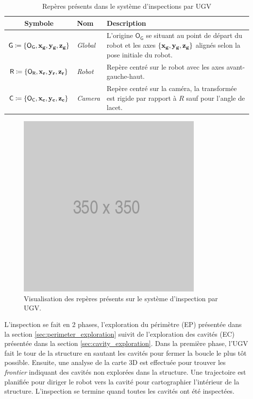 \begin{table}[htp]
  \centering
  \setlength{\tabcolsep}{12pt}
  \begin{tabular}[htp]{|c|l|p{9cm}|}
    \hline
    Symbole & Nom                   & Description\\\hline
    $\mathsf{G} \coloneqq \{\mathsf{O_G}, \mathbf{x_g}, \mathbf{y_g}, \mathbf{z_g} \} $     &  \textit{Global}      & L'origine $\mathsf{O_G}$ se situant au point de départ du robot et les axes $\{\mathbf{x_g}, \mathbf{y_g}, \mathbf{z_g} \}$ alignés selon la pose initiale du robot.\\\hline
    $\mathsf{R} \coloneqq \{\mathsf{O_R}, \mathbf{x_r}, \mathbf{y_r}, \mathbf{z_r} \} $     &  \textit{Robot}       & Repère centré sur le robot avec les axes avant-gauche-haut.\\\hline
    $\mathsf{C} \coloneqq \{\mathsf{O_C}, \mathbf{x_c}, \mathbf{y_c}, \mathbf{z_c} \}$     &  \textit{Camera}      & Repère centré sur la caméra, la transformée est rigide par rapport à $R$ sauf pour l'angle de lacet. \\\hline
  \end{tabular}
  \setlength{\tabcolsep}{6pt}
  \caption{Repères présents dans le système d'inspections par UGV}
  \label{table:ugv_frames}
\end{table}

\begin{figure}[htp]
  \centering
  \includegraphics[width=0.3\linewidth]{images/placeholder.png}
  \caption{Visualisation des repères présents sur le système d'inspection par UGV.}
  \label{fig:ugv_frames}
\end{figure}

L'inspection se fait en 2 phases, l'exploration du périmètre (EP) présentée dans la section \ref{sec:perimeter_exploration} suivit de l'exploration des cavités (EC) présentée dans la section \ref{sec:cavity_exploration}. Dans la première phase, l'UGV fait le tour de la structure en sautant les cavités pour fermer la boucle le plus tôt possible. Ensuite, une analyse de la carte 3D est effectuée pour trouver les \textit{frontier} indiquant des cavités non explorées dans la structure. Une trajectoire est planifiée pour diriger le robot vers la cavité pour cartographier l'intérieur de la structure. L'inspection se termine quand toutes les cavités ont été inspectées.

